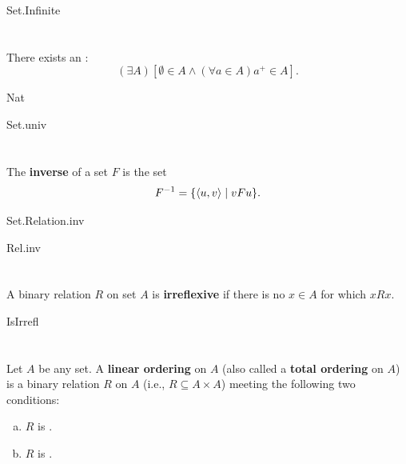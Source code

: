 \documentclass{report}
\begin{document}
    {Set.Infinite}

\section{}%

  There exists an :
    $$(\exists A)\left[
      \emptyset \in A \land (\forall a \in A) a^+ \in A\right].$$

    {Nat}

    {Set.univ}

\section{}%

  The \textbf{inverse} of a set $F$ is the set
    $$F^{-1} = \{\left< u, v \right> \mid vFu\}.$$

    {Set.Relation.inv}

    {Rel.inv}

\section{}%

  A binary relation $R$ on set $A$ is \textbf{irreflexive} if there is no
    $x \in A$ for which $xRx$.

    {IsIrrefl}

\section{}

  Let $A$ be any set.
  A \textbf{linear ordering} on $A$ (also called a \textbf{total ordering} on
    $A$) is a binary relation $R$ on $A$ (i.e., $R \subseteq A \times A$)
    meeting the following two conditions:

  \begin{enumerate}[(a)]
    \item $R$ is .
    \item $R$ is .
  \end{enumerate}
\end{document}
